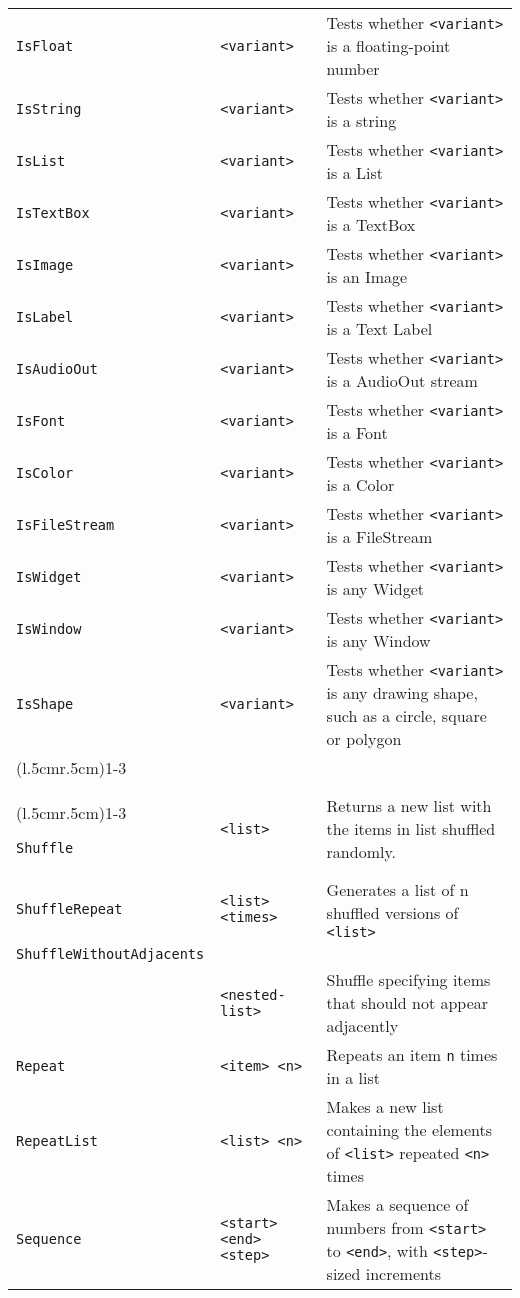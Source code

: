 \begin{longtable}{p{3cm}p{3cm}p{6cm}}
\verb+IsFloat+ & \verb+<variant>+ & Tests whether \verb+<variant>+ is a floating-point number\\ 
\verb+IsString+ & \verb+<variant>+ & Tests whether \verb+<variant>+ is a string\\ 
\verb+IsList+ & \verb+<variant>+ & Tests whether \verb+<variant>+ is a List\\ 
\verb+IsTextBox+ & \verb+<variant>+ & Tests whether \verb+<variant>+ is a TextBox\\ 
\verb+IsImage+ & \verb+<variant>+ & Tests whether \verb+<variant>+ is an Image\\ 
\verb+IsLabel+ & \verb+<variant>+ & Tests whether \verb+<variant>+ is a Text Label\\ 
\verb+IsAudioOut+ & \verb+<variant>+ & Tests whether \verb+<variant>+ is a AudioOut stream\\ 
\verb+IsFont+ & \verb+<variant>+ & Tests whether \verb+<variant>+ is a Font\\ 
\verb+IsColor+ & \verb+<variant>+ & Tests whether \verb+<variant>+ is a Color\\ 
\verb+IsFileStream+ & \verb+<variant>+ & Tests whether \verb+<variant>+ is a FileStream\\ 
\verb+IsWidget+ & \verb+<variant>+ & Tests whether \verb+<variant>+ is
any Widget\\ 
\verb+IsWindow+ & \verb+<variant>+ & Tests whether \verb+<variant>+ is
any Window\\ 
\verb+IsShape+ & \verb+<variant>+ & Tests whether \verb+<variant>+ is any drawing shape, such as a circle, square or polygon\\ 

\addlinespace[0.2cm] 

\cmidrule(l{.5cm}r{.5cm}){1-3} 
\multicolumn{3}{c}{\textbf{List Manipulation Functions}}\\ 
\cmidrule(l{.5cm}r{.5cm}){1-3} 

\verb+Shuffle+ & \verb+<list>+ & Returns a new list with the items in list shuffled randomly. \\ 

\verb+ShuffleRepeat+&\verb+<list>+ \verb+<times>+&Generates a list of {{{n}}} shuffled versions of \verb+<list>+\\
\verb+ShuffleWithoutAdjacents+\\
&\verb+<nested-list>+&Shuffle specifying items that should not appear adjacently\\
\verb+Repeat+ & \verb+<item> <n>+& Repeats an item \verb+n+ times in a list\\ 
\verb+RepeatList+ & \verb+<list> <n>+ & Makes a new list containing 
the elements of \verb+<list>+ repeated \verb+<n>+ times\\ 
\verb+Sequence+ & \verb+<start>+ \verb+<end>+ \verb+<step>+ & Makes a sequence of numbers 
from \verb+<start>+ to \verb+<end>+, with \verb+<step>+-sized increments\\ 


\end{longtable}

